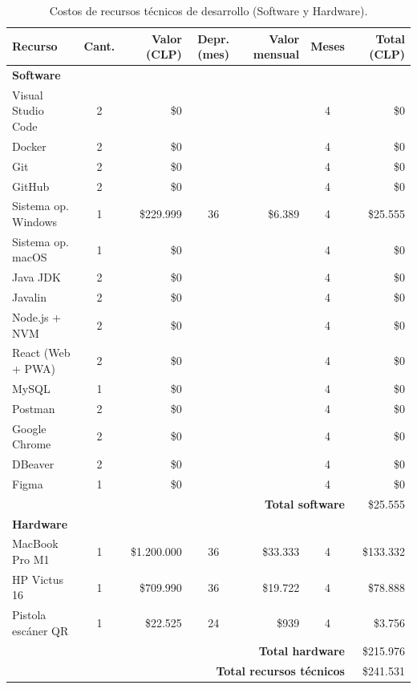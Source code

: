 \begin{table}[H]
    \centering
    \caption{Costos de recursos técnicos de desarrollo (Software y Hardware).}
    \label{tab:costos_recursos_tecnicos}
    {\footnotesize\setlength{\tabcolsep}{3pt}
    \begin{tabular}{|p{}|c|r|c|r|c|r|}
    \hline
    \textbf{Recurso} & \textbf{Cant.} & \textbf{Valor (CLP)} & \textbf{Depr. (mes)} & \textbf{Valor mensual} & \textbf{Meses} & \textbf{Total (CLP)}\\
    \hline
    \multicolumn{7}{|l|}{\textbf{Software}}\\ \hline
    Visual Studio Code & 2 & \$0 & & & 4 & \$0\\
    Docker & 2 & \$0 & & & 4 & \$0\\
    Git & 2 & \$0 & & & 4 & \$0\\
    GitHub & 2 & \$0 & & & 4 & \$0\\
    Sistema op. Windows & 1 & \$229.999 & 36 & \$6.389 & 4 & \$25.555\\
    Sistema op. macOS & 1 & \$0 & & & 4 & \$0\\
    Java JDK & 2 & \$0 & & & 4 & \$0\\
    Javalin & 2 & \$0 & & & 4 & \$0\\
    Node.js + NVM & 2 & \$0 & & & 4 & \$0\\
    React (Web + PWA) & 2 & \$0 & & & 4 & \$0\\
    MySQL & 1 & \$0 & & & 4 & \$0\\
    Postman & 2 & \$0 & & & 4 & \$0\\
    Google Chrome & 2 & \$0 & & & 4 & \$0\\
    DBeaver & 2 & \$0 & & & 4 & \$0\\
    Figma & 1 & \$0 & & & 4 & \$0\\ \hline
    \multicolumn{6}{|r|}{\textbf{Total software}} & \$25.555\\
    \hline \hline
    \multicolumn{7}{|l|}{\textbf{Hardware}}\\ \hline
    MacBook Pro M1 & 1 & \$1.200.000 & 36 & \$33.333 & 4 & \$133.332\\
    HP Victus 16 & 1 & \$709.990 & 36 & \$19.722 & 4 & \$78.888\\
    Pistola escáner QR & 1 & \$22.525 & 24 & \$939 & 4 & \$3.756\\ \hline
    \multicolumn{6}{|r|}{\textbf{Total hardware}} & \$215.976\\
    \hline \hline
    \multicolumn{6}{|r|}{\textbf{Total recursos técnicos}} & \$241.531\\
    \hline
    \end{tabular}
    }
\end{table}

